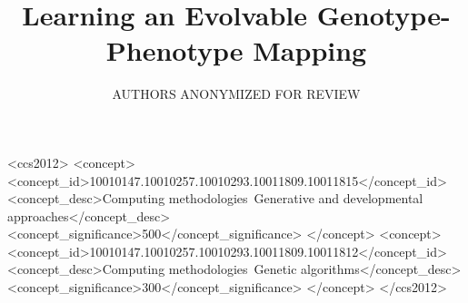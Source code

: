 \documentclass[sigconf, authordraft]{acmart}
\begin{document}
\title{Learning an Evolvable Genotype-Phenotype Mapping}

\author{AUTHORS ANONYMIZED FOR REVIEW}
%
%

\begin{abstract}
  
\end{abstract}

%
%
\begin{CCSXML}
<ccs2012>
<concept>
<concept_id>10010147.10010257.10010293.10011809.10011815</concept_id>
<concept_desc>Computing methodologies~Generative and developmental approaches</concept_desc>
<concept_significance>500</concept_significance>
</concept>
<concept>
<concept_id>10010147.10010257.10010293.10011809.10011812</concept_id>
<concept_desc>Computing methodologies~Genetic algorithms</concept_desc>
<concept_significance>300</concept_significance>
</concept>
</ccs2012>
\end{CCSXML}



\maketitle





\end{document}
